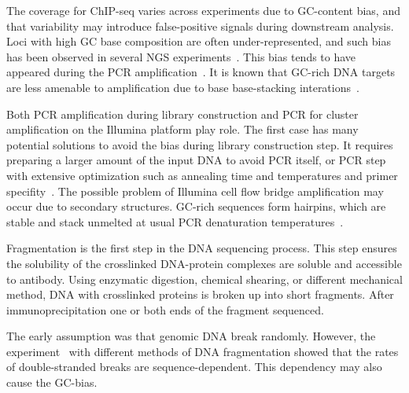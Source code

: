 The coverage for ChIP-seq varies across experiments due to GC-content bias, and that variability may introduce false-positive signals during downstream analysis.
Loci with high GC base composition are often under-represented, and such bias has been observed in several NGS experiments~\cite{benjamini2012summarizing,dohm2008substantial,teng2017accounting}.
This bias tends to have appeared during the PCR amplification~\cite{ross2013characterizing}.
It is known that GC-rich DNA targets are less amenable to amplification due to base base-stacking interations~\cite{yakovchuk2006base}.

Both PCR amplification during library construction and PCR for cluster amplification on the Illumina platform play role. 
The first case has many potential solutions to avoid the bias during library construction step.
It requires preparing a larger amount of the input DNA to avoid PCR itself, or PCR step with extensive optimization such as annealing time and temperatures and primer specifity~\cite{aird2011analyzing}.
The possible problem of Illumina cell flow bridge amplification may occur due to secondary structures.
GC-rich sequences form hairpins, which are stable and stack unmelted at usual PCR denaturation temperatures~\cite{stein2010nucleosome}.

Fragmentation is the first step in the DNA sequencing process.
This step ensures the solubility of the crosslinked DNA-protein complexes are soluble and accessible to antibody.
Using enzymatic digestion, chemical shearing, or different mechanical method, DNA with crosslinked proteins is broken up into short fragments.
After immunoprecipitation one or both ends of the fragment sequenced.

The early assumption was that genomic DNA break randomly.
However, the experiment~\cite{poptsova2014non} with different methods of DNA fragmentation showed that the rates of double-stranded breaks are sequence-dependent.
This dependency may also cause the GC-bias. 

